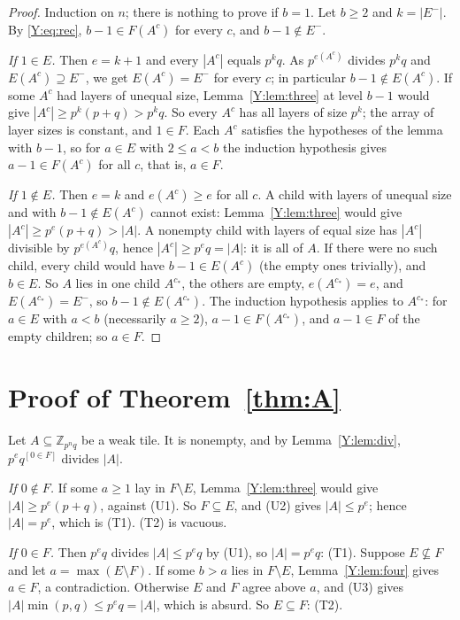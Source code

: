 \documentclass[11pt,a4paper]{amsart}
\theoremstyle{definition}
\theoremstyle{remark}
\newcommand{\Z}{\mathbb{Z}}
\begin{document}
\begin{proof}
Induction on $n$; there is nothing to prove if $b=1$. Let $b\ge2$ and $k=|E^-|$. By \eqref{Y:eq:rec},
$b-1\in F(A^c)$ for every $c$, and $b-1\notin E^-$.

\emph{If $1\in E$.} Then $e=k+1$ and every $|A^c|$ equals $p^kq$. As $p^{e(A^c)}$ divides $p^kq$ and
$E(A^c)\supseteq E^-$, we get $E(A^c)=E^-$ for every $c$; in particular $b-1\notin E(A^c)$. If some $A^c$ had
layers of unequal size, Lemma~\ref{Y:lem:three} at level $b-1$ would give $|A^c|\ge p^k(p+q)>p^kq$. So every
$A^c$ has all layers of size $p^k$; the array of layer sizes is constant, and $1\in F$. Each $A^c$ satisfies
the hypotheses of the lemma with $b-1$, so for $a\in E$ with $2\le a<b$ the induction hypothesis gives
$a-1\in F(A^c)$ for all $c$, that is, $a\in F$.

\emph{If $1\notin E$.} Then $e=k$ and $e(A^c)\ge e$ for all $c$. A child with layers of unequal size and with
$b-1\notin E(A^c)$ cannot exist: Lemma~\ref{Y:lem:three} would give $|A^c|\ge p^e(p+q)>|A|$. A nonempty child
with layers of equal size has $|A^c|$ divisible by $p^{e(A^c)}q$, hence $|A^c|\ge p^eq=|A|$: it is all of $A$.
If there were no such child, every child would have $b-1\in E(A^c)$ (the empty ones trivially), and $b\in E$.
So $A$ lies in one child $A^{c_*}$, the others are empty, $e(A^{c_*})=e$, and
$E(A^{c_*})=E^-$, so $b-1\notin E(A^{c_*})$. The induction hypothesis applies to $A^{c_*}$: for $a\in E$ with
$a<b$ (necessarily $a\ge2$), $a-1\in F(A^{c_*})$, and $a-1\in F$ of the empty children; so $a\in F$.
\end{proof}

\section{Proof of Theorem~\ref{thm:A}}\label{Y:sec:proof}

Let $A\subseteq\Z_{p^nq}$ be a weak tile. It is nonempty, and by Lemma~\ref{Y:lem:div}, $p^eq^{[0\in F]}$
divides $|A|$.

\emph{If $0\notin F$.} If some $a\ge1$ lay in $F\setminus E$, Lemma~\ref{Y:lem:three} would give
$|A|\ge p^e(p+q)$, against (U1). So $F\subseteq E$, and (U2) gives $|A|\le p^e$; hence $|A|=p^e$, which is
(T1). (T2) is vacuous.

\emph{If $0\in F$.} Then $p^eq$ divides $|A|\le p^eq$ by (U1), so $|A|=p^eq$: (T1). Suppose
$E\not\subseteq F$ and let $a=\max(E\setminus F)$. If some $b>a$ lies in $F\setminus E$,
Lemma~\ref{Y:lem:four} gives $a\in F$, a contradiction. Otherwise $E$ and $F$ agree above $a$, and (U3) gives
$|A|\min(p,q)\le p^eq=|A|$, which is absurd. So $E\subseteq F$: (T2).
\end{document}

